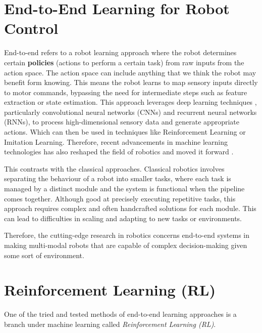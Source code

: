 \section{End-to-End Learning for Robot Control}

  End-to-end refers to a robot learning approach where the robot determines certain \textbf{policies} (actions to perform a certain task) from raw inputs from the action space. The action space can include anything that we think the robot may benefit form knowing. This means the 
  robot learns to map sensory inputs directly to motor commands, bypassing the need for intermediate steps such as feature extraction or state estimation. This approach leverages deep learning techniques \cite{Schmidhuber2015nn}, particularly convolutional neural networks (CNNs) and recurrent neural networks (RNNs), to process high-dimensional sensory data and generate appropriate actions. Which can then be used in techniques like Reinforcement Learning  or Imitation Learning.  Therefore, recent advancements in machine learning technologies has also reshaped the field of robotics and moved it forward \cite{Pierson18082017,newbury2023graspSynthReview,liu2021DRLminireview}.


  This contrasts with the classical approaches. Classical robotics involves separating the behaviour of a robot into smaller tasks, where each task is managed by a distinct module and the system is functional when the pipeline comes together. Although good at precisely executing repetitive tasks, this approach requires complex and often handcrafted solutions for each module. This can lead to difficulties in scaling and adapting to new tasks or environments. 
  
  Therefore, the cutting-edge research in robotics concerns end-to-end systems in making multi-modal robots  that are capable of complex decision-making given some sort of environment.

\section{Reinforcement Learning (RL)}
  One of the tried and tested methods of end-to-end learning approaches is a branch under machine learning called \emph{Reinforcement Learning (RL)}. 

